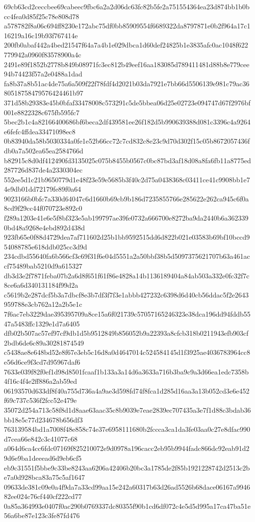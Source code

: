 {69cb63cd2ceccbee69cabeec9fbc6a2a2d06dc63fc82b5fe2a751554364ea23d874bb1b0bcc4fea0d85f25c78e808d78
a578782f8a06c694ff8230e172abc75df0bb85909554f6689322da8797871e0b2f964a17c116219a16c19b93f767414e
200fb0abaf442a4bed21547f64a7a4b1e029dbca1d60def24825b1e3835afc0ac1048f622779942a0960f83578900a4c
2491e89f1852b2778b849b08971fc3ec812b49eef16aa183085d789411481d88b8e779cee94b74423f57a2e0488a1dad
fa8b37a8b51ac4de75a6a509f22f78fdf4d2021b03da7921e7bb66d5506139e981c79ac3680518758479576424461b97
371d58b29383e45b0bfaf33478008c573291c5de5bbea06d25e02723e094747d67f2976bf001e8822328c675fb595fc7
5bec2b1c4a82166400686bf6beca2df439581ee26f182d5b990639388d081c3396c4a9264e6fefc4ffdea33471098ec8
0b83940da58b5030334a0fe1e52b66cc72c7cd832c8e23c9d70d302f15c05b8672057436fdb0a7a502ea65ea2584766d
b82915c8d0df412490fd3135025c075b8455b0567c0bc87bd3af18d08a8fa6fb11a8775ed287726d837de4a2330304ec
552ee5d1c21b9650779d1e48f23e59e5685b3f40c2d75a0438368c03411ce41c9908bb1e74e9db01dd72179fe89f0a64
9023166b0bfc7a330d64047c6d1660b69cb9b186d7235855766e285622e262ca945c6f0a8cd9f29cc44f070723e892c0
f289a1203e41e6e5f8bf323e5ab199797ae39fe0732a666700e8272ba9da2440b6a3623390bd48a9268e4ebd892d438d
923fb65e0f88d4729dea7af711602d25b1bb9592515dd6d822b021e03583b69bf10bccd954088785e618ddb025cc3d9d
234cdbd55640fa6b566cf3c69f31f6e04d5551a2a50bbf38b5d5097375621707b63a461accf75489bab5210d9a615327
db3d3e2f7871feba07b2a6d8f651f61f86e4828a14b1136189404a84ab503a332e0fc32f7c8ce6a6d340131184f99d2a
c5619b2e287dcf5b3a7dbcf8e3b7df3f7f3e1abbb427232c6398d6d40cb56ddac5f2e2643959788e3cb762a12a2b5e1c
7f6ac7eb3229dae395395709a8ce15a6f021739c57057165246323e38dca196dd94fddb5547a5483ffc1329e1d7a6405
dfb02b507ac57ef97cf9db1d5b9512849b856052b9a22393a8cfcb318b0211943efb903cf2bdb6de6c89a30281874549
c5438ae8e648bd52e8f67e3eb5c16d8a0d4647014c524584145d1f3925ae4036783964cc8e56d6ce9f3cd7d95967daf6
7633e039f82f0ef1d98d8501fcaaf1b133a3a14d6a3633a716b3ba9c9a3d66ea1edc7358b4f16c4f4e2ff886a2ab59ed
06193570d633df8f40a755d736a4a9ae3d598fd74f8fca1d285d16aa3a13b052cd3e6e452f69c737c536f2fcc52e479e
35072d254a713c58f8d1d8aae63aac35c8b9039e7eae2839ec707435a3e7f1d88c3bdab36bb18e5c77d234678b656df3
763139584bd1a7008f48e858c74e37e6958111680b2fccca3ca1da3fe03aa0c27e8dfac990d7cea66e842c3c41077c68
a064d6ca4cc6fdc07169f825210072e9d0978a196cacc2eb95b9944fadc866dc92eab91d29d6e9ba1deeead6d9eb6cf5
eb9c31551f5bbe9c33be8243aa6206a42406b20bc3a1785de2f85b1921228742d2513c2be7a0d928bca83a75c5af1647
09633de381c09e0a4f9da7a33cd99aa15e242a60317b63d26ad5526b68dace06167a994682ee024c76cf440cf222cd77
0a85a364993e0407f0ac290b0769337dc80355f90b1cd6df072c4e5d5d995a17ca47ba51e56a6be87e123c3fe87fd476
}
